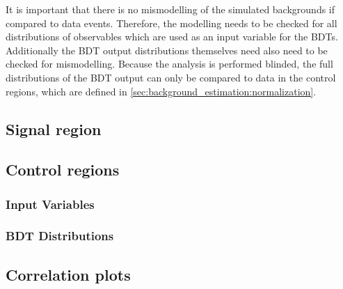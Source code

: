 It is important that there is no mismodelling of the simulated backgrounds if compared to data events.
Therefore, the modelling needs to be checked for all distributions of observables which are used as an input variable for the BDTs.
Additionally the BDT output distributions themselves need also need to be checked for mismodelling.
Because the analysis is performed blinded, the full distributions of the BDT output can only be compared to data in the control regions, which
are defined in \cref{sec:background_estimation:normalization}.

\subsection{Signal region}


\subsection{Control regions}

\subsubsection{Input Variables}

\subsubsection{BDT Distributions}

\subsection{Correlation plots}


